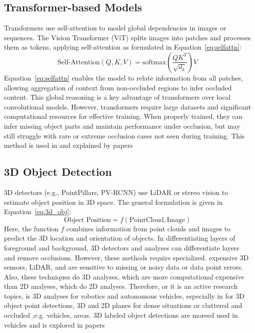 \documentclass[12pt,a4paper]{report}
\theoremstyle{definition}
\theoremstyle{remark}
\begin{document}
\subsection{Transformer-based Models}
Transformers use self-attention to model global dependencies in images or sequences. The Vision Transformer (ViT) splits images into patches and processes them as tokens, applying self-attention as formulated in Equation~\ref{eq:selfattn}:
\begin{equation}
\label{eq:selfattn}
\text{Self-Attention}(Q, K, V) = \text{softmax}\left(\frac{QK^T}{\sqrt{d_k}}\right)V
\end{equation}
Equation~\ref{eq:selfattn} enables the model to relate information from all patches, allowing aggregation of context from non-occluded regions to infer occluded content. This global reasoning is a key advantage of transformers over local convolutional models. However, transformers require large datasets and significant computational resources for effective training. When properly trained, they can infer missing object parts and maintain performance under occlusion, but may still struggle with rare or extreme occlusion cases not seen during training. This method is used in and explained by papers ~\cite{paper10,paper42,paper47}

\subsection{3D Object Detection}
3D detectors (e.g., PointPillars, PV-RCNN) use LiDAR or stereo vision to estimate object position in 3D space. The general formulation is given in Equation~\ref{eq:3d_obj}:
\begin{equation}
\label{eq:3d_obj}
\text{Object Position} = f(\text{PointCloud}, \text{Image})
\end{equation}
Here, the function $f$ combines information from point clouds and images to predict the 3D location and orientation of objects. In differentiating layers of foreground and background, 3D detectors and analyses can differentiate layers and remove occlusions. However, these methods require specialized. expensive 3D sensors, LiDAR, and are sensitive to missing or noisy data or data point errors. Also, these techniques do 3D analyses, which are more computational expensive than 2D analyses, which do 2D analyses. Therefore, or it is an active research topics, is 3D analyses for robotics and autonomous vehicles, especially in for 3D object point detections, 3D and 2D planes for dense situations or cluttered and occluded ,e.g. vehicles, areas. 3D labeled object detections are moreed used in vehicles and is explored in papers ~\cite{paper2,paper15,paper16,paper23,paper39,paper46,paper50}
\end{document}
